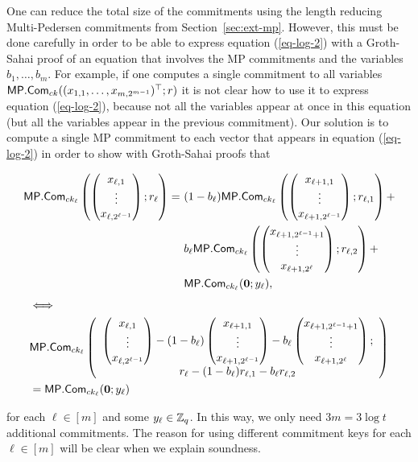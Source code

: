 One can reduce the total size of the commitments using the length reducing Multi-Pedersen commitments from Section~\ref{sec:ext-mp}. However, this must be done carefully in order to be able to express equation (\ref{eq-log-2}) with a Groth-Sahai proof of an equation that involves the MP commitments and the variables $b_1,\ldots,b_m$. For example, if one computes a single commitment to all variables $\mathsf{MP}.\mathsf{Com}_{ck}((x_{1,1},\ldots,x_{m,2^{m-1}})^\top;r)$ it is not clear how to use it to express equation (\ref{eq-log-2}), because not all the variables appear at once in this equation (but all the variables appear in the previous commitment). Our solution is to compute a single MP commitment to each vector that appears in equation (\ref{eq-log-2}) in order to show with Groth-Sahai proofs that
\begin{small}
\begin{align*}
\MP.\Com_{ck_\ell}\left(
                    \pmatri{x_{\ell,1}\\\vdots\\x_{\ell,2^{\ell-1}}};r_\ell\right)
=\ &(1-b_\ell)\MP.\Com_{ck_\ell}\left(\pmatri{x_{\ell+1,1}\\\vdots\\x_{\ell+1,2^{\ell-1}}};r_{\ell,1}\right)+\\
& b_\ell\MP.\Com_{ck_\ell}\left(\pmatri{x_{\ell+1,2^{\ell-1}+1}\\\vdots\\x_{\ell+1,2^\ell}};r_{\ell,2}\right)+\\
& \MP.\Com_{ck_\ell}(\vecb{0};y_\ell),
\end{align*}
\begin{align*}
&\Longleftrightarrow\\
&\mathsf{MP}.\mathsf{Com}_{ck_\ell}\left(\begin{array}{c}
    \left(\begin{matrix}x_{\ell,1}\\\vdots\\x_{\ell,2^{\ell-1}}\end{matrix}\right)
    -(1-b_\ell)\left(\begin{matrix}x_{\ell+1,1}\\\vdots\\x_{\ell+1,2^{\ell-1}}\end{matrix}\right)
    -b_\ell\left(\begin{matrix}x_{\ell+1,2^{\ell-1}+1}\\\vdots\\x_{\ell+1,2^\ell}\end{matrix}\right);\\
    r_\ell-(1-b_\ell)r_{\ell,1}-b_\ell r_{\ell,2}
\end{array}\right)\\
&=
\mathsf{MP}.\mathsf{Com}_{ck_\ell}(\mathbf{0};y_\ell)
\end{align*}\end{small}
for each $\ell\in[m]$ and some $y_\ell\in\mathbb{Z}_q$. In this way, we only need $3m=3\log t$ additional commitments. The reason for using different commitment keys for each $\ell\in[m]$ will be clear when we explain soundness.

